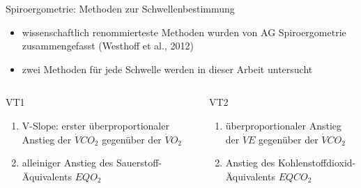 \documentclass[colorBG,slideColor,9pt]{beamer}
\begin{document}
\begin{frame}{Spiroergometrie: Methoden zur Schwellenbestimmung}
\begin{itemize}
\item wissenschaftlich renommierteste Methoden wurden von AG Spiroergometrie zusammengefasst (Westhoff et al., 2012)
\item zwei Methoden für jede Schwelle werden in dieser Arbeit untersucht
\end{itemize}
\begin{columns}
\begin{column}{5cm}
\begin{block}{VT1}
\begin{enumerate}
\item V-Slope: erster überproportionaler Anstieg der $\dot{V}CO_2$ gegenüber der $\dot{V}O_2$
\item alleiniger Anstieg des Sauerstoff-Äquivalents $EQO_2$
\end{enumerate}
\end{block}
\end{column}
\begin{column}{5cm}
\begin{block}{VT2}
\begin{enumerate}
\item überproportionaler Anstieg der $\dot{V}E$ gegenüber der $\dot{V}CO_2$
\item Anstieg des Kohlenstoffdioxid-Äquivalents $EQCO_2$
\end{enumerate}
\end{block}
\end{column}
\end{columns}
\end{frame}
\end{document}
